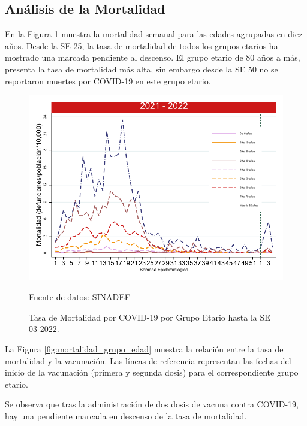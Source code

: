 \documentclass[12pt,a4paper,openany]{book}
\begin{document}
	\subsection*{Análisis de la Mortalidad}

	\noindent En la Figura \ref{fig:mortalidad_edad} muestra la mortalidad semanal para las edades agrupadas en diez años. Desde la SE 25, la tasa de mortalidad de todos los grupos etarios ha mostrado una marcada pendiente al descenso. El grupo etario de 80 años a más, presenta la tasa de mortalidad más alta, sin embargo desde la SE 50 no se reportaron muertes por COVID-19 en 
	este grupo etario.
	 	
\begin{figure}[h]
	\caption{Tasa de Mortalidad por COVID-19 por Grupo Etario hasta la SE 03-2022.}\label{fig:mortalidad_edad}
	\begin{center}
		\includegraphics[width=0.65\linewidth]{../figuras/mortalidad_edad.pdf}
	\end{center}
	{\footnotesize Fuente de datos: SINADEF} 
\end{figure}


	La Figura \ref{fig:mortalidad_grupo_edad} muestra la relación entre la tasa de mortalidad y la vacunación. Las líneas de referencia representan las fechas del inicio de la vacunación (primera y segunda dosis) para el correspondiente grupo etario. 
	
	Se observa que tras la administración de dos dosis de vacuna contra COVID-19,  hay una pendiente marcada en descenso de la tasa de mortalidad. 
\end{document}
